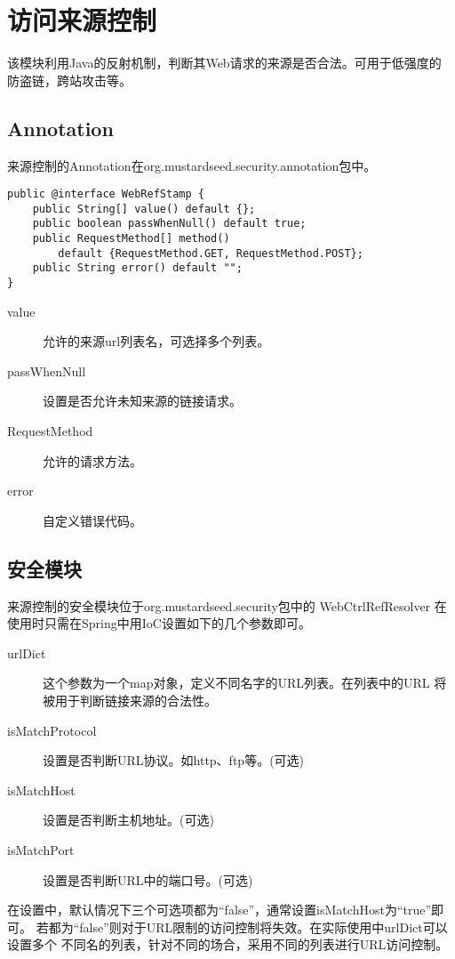 \section{访问来源控制}
该模块利用Java的反射机制，判断其Web请求的来源是否合法。可用于低强度的
防盗链，跨站攻击等。

\subsection{Annotation}
来源控制的Annotation在org.mustardseed.security.annotation包中。
\begin{verbatim}
public @interface WebRefStamp {
    public String[] value() default {};
    public boolean passWhenNull() default true;
    public RequestMethod[] method() 
        default {RequestMethod.GET, RequestMethod.POST};
    public String error() default "";
}
\end{verbatim}

\begin{description}
\item[value] 允许的来源url列表名，可选择多个列表。
\item[passWhenNull] 设置是否允许未知来源的链接请求。
\item[RequestMethod] 允许的请求方法。
\item[error] 自定义错误代码。
\end{description}

\subsection{安全模块}
来源控制的安全模块位于org.mustardseed.security包中的 WebCtrlRefResolver
在使用时只需在Spring中用IoC设置如下的几个参数即可。
\begin{description}
\item[urlDict] 这个参数为一个map对象，定义不同名字的URL列表。在列表中的URL
将被用于判断链接来源的合法性。
\item[isMatchProtocol] 设置是否判断URL协议。如http、ftp等。(可选)
\item[isMatchHost] 设置是否判断主机地址。(可选)
\item[isMatchPort] 设置是否判断URL中的端口号。(可选)
\end{description}

在设置中，默认情况下三个可选项都为``false''，通常设置isMatchHost为``true''即可。
若都为``false''则对于URL限制的访问控制将失效。在实际使用中urlDict可以设置多个
不同名的列表，针对不同的场合，采用不同的列表进行URL访问控制。
